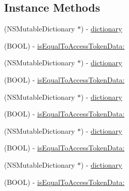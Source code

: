 \subsection*{Instance Methods}
\begin{DoxyCompactItemize}
\item 
(N\+S\+Mutable\+Dictionary $\ast$) -\/ \hyperlink{interfaceFBAccessTokenData_aca74d0fd769aea62fb70912bec9aba4d}{dictionary}
\item 
(B\+O\+OL) -\/ \hyperlink{interfaceFBAccessTokenData_ac4da9dbf9d0c3c0bceb2d6b93cd764e2}{is\+Equal\+To\+Access\+Token\+Data\+:}
\item 
(N\+S\+Mutable\+Dictionary $\ast$) -\/ \hyperlink{interfaceFBAccessTokenData_aca74d0fd769aea62fb70912bec9aba4d}{dictionary}
\item 
(B\+O\+OL) -\/ \hyperlink{interfaceFBAccessTokenData_ac4da9dbf9d0c3c0bceb2d6b93cd764e2}{is\+Equal\+To\+Access\+Token\+Data\+:}
\item 
(N\+S\+Mutable\+Dictionary $\ast$) -\/ \hyperlink{interfaceFBAccessTokenData_aca74d0fd769aea62fb70912bec9aba4d}{dictionary}
\item 
(B\+O\+OL) -\/ \hyperlink{interfaceFBAccessTokenData_ac4da9dbf9d0c3c0bceb2d6b93cd764e2}{is\+Equal\+To\+Access\+Token\+Data\+:}
\item 
(N\+S\+Mutable\+Dictionary $\ast$) -\/ \hyperlink{interfaceFBAccessTokenData_aca74d0fd769aea62fb70912bec9aba4d}{dictionary}
\item 
(B\+O\+OL) -\/ \hyperlink{interfaceFBAccessTokenData_ac4da9dbf9d0c3c0bceb2d6b93cd764e2}{is\+Equal\+To\+Access\+Token\+Data\+:}
\item 
(N\+S\+Mutable\+Dictionary $\ast$) -\/ \hyperlink{interfaceFBAccessTokenData_aca74d0fd769aea62fb70912bec9aba4d}{dictionary}
\item 
(B\+O\+OL) -\/ \hyperlink{interfaceFBAccessTokenData_ac4da9dbf9d0c3c0bceb2d6b93cd764e2}{is\+Equal\+To\+Access\+Token\+Data\+:}
\end{DoxyCompactItemize}
